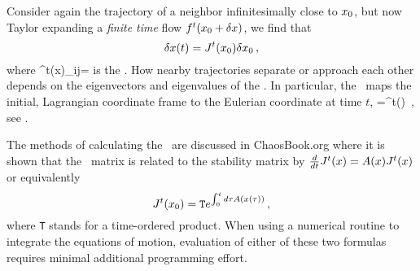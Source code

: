 Consider again the trajectory of a  neighbor infinitesimally close
to ${x_0}$, but now Taylor expanding a \emph{finite time} flow
$f^t({x_0} +\delta x)$, we find that
\[
 \delta x(t) = J^t({x_0})\delta {x_0}
 \,,
\]
where
\beq
\jMps^t(x)_{ij}=
is the \jacobianM. How nearby trajectories separate or approach each other depends on the eigenvectors and eigenvalues of the \jacobianM. In particular, the \jacobianM\ maps the initial, Lagrangian coordinate frame to the Eulerian coordinate at time $t$,
\beq
{}=\jMps^t(\xInit) \velField{\xInit}
\,,
see .

The methods of calculating the \jacobianM\ are discussed in ChaosBook.org where it is shown that the \jacobianM\ matrix is related to the stability matrix by $\frac{d}{dt} \jMps^t(x)=\Mvar (x) \jMps^t(x)$ or equivalently
\[
\jMps^t(\xInit)= \texttt{T} e^{\int^t_0 d\tau \Mvar (x(\tau))}
 \,,
\]
where \texttt{T} stands for a time-ordered product. When using a numerical routine to integrate the equations of motion, evaluation of either of these two formulas requires minimal additional programming effort.



